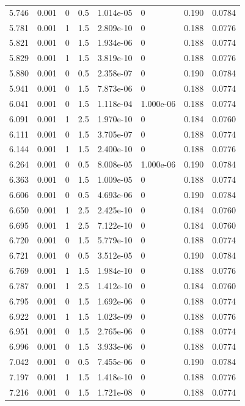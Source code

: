\documentclass[preview]{standalone}
\begin{document}
{{{\begin{tabular}{L{1.2cm}C{1.2cm} C{0.3cm}C{0.5cm} C{1.4cm}C{1.4cm} C{1.4cm}C{1.4cm}}
  5.746  &  0.001  & 0     & 0.5 &  1.014e-05  & 0  & 0.190 &  0.0784   \\ 
  5.781  &  0.001  & 1     & 1.5 &  2.809e-10  & 0  & 0.188 &  0.0776   \\ 
  5.821  &  0.001  & 0     & 1.5 &  1.934e-06  & 0  & 0.188 &  0.0774   \\ 
  5.829  &  0.001  & 1     & 1.5 &  3.819e-10  & 0  & 0.188 &  0.0776   \\ 
  5.880  &  0.001  & 0     & 0.5 &  2.358e-07  & 0  & 0.190 &  0.0784   \\ 
  5.941  &  0.001  & 0     & 1.5 &  7.873e-06  & 0  & 0.188 &  0.0774   \\ 
  6.041  &  0.001  & 0     & 1.5 &  1.118e-04  & 1.000e-06  & 0.188 &  0.0774   \\ 
  6.091  &  0.001  & 1     & 2.5 &  1.970e-10  & 0  & 0.184 &  0.0760   \\ 
  6.111  &  0.001  & 0     & 1.5 &  3.705e-07  & 0  & 0.188 &  0.0774   \\ 
  6.144  &  0.001  & 1     & 1.5 &  2.400e-10  & 0  & 0.188 &  0.0776   \\ 
  6.264  &  0.001  & 0     & 0.5 &  8.008e-05  & 1.000e-06  & 0.190 &  0.0784   \\ 
  6.363  &  0.001  & 0     & 1.5 &  1.009e-05  & 0  & 0.188 &  0.0774   \\ 
  6.606  &  0.001  & 0     & 0.5 &  4.693e-06  & 0  & 0.190 &  0.0784   \\ 
  6.650  &  0.001  & 1     & 2.5 &  2.425e-10  & 0  & 0.184 &  0.0760   \\ 
  6.695  &  0.001  & 1     & 2.5 &  7.122e-10  & 0  & 0.184 &  0.0760   \\ 
  6.720  &  0.001  & 0     & 1.5 &  5.779e-10  & 0  & 0.188 &  0.0774   \\ 
  6.721  &  0.001  & 0     & 0.5 &  3.512e-05  & 0  & 0.190 &  0.0784   \\ 
  6.769  &  0.001  & 1     & 1.5 &  1.984e-10  & 0  & 0.188 &  0.0776   \\ 
  6.787  &  0.001  & 1     & 2.5 &  1.412e-10  & 0  & 0.184 &  0.0760   \\ 
  6.795  &  0.001  & 0     & 1.5 &  1.692e-06  & 0  & 0.188 &  0.0774   \\ 
  6.922  &  0.001  & 1     & 1.5 &  1.023e-09  & 0  & 0.188 &  0.0776   \\ 
  6.951  &  0.001  & 0     & 1.5 &  2.765e-06  & 0  & 0.188 &  0.0774   \\ 
  6.996  &  0.001  & 0     & 1.5 &  3.933e-06  & 0  & 0.188 &  0.0774   \\ 
  7.042  &  0.001  & 0     & 0.5 &  7.455e-06  & 0  & 0.190 &  0.0784   \\ 
  7.197  &  0.001  & 1     & 1.5 &  1.418e-10  & 0  & 0.188 &  0.0776   \\ 
  7.216  &  0.001  & 0     & 1.5 &  1.721e-08  & 0  & 0.188 &  0.0774   \\ 
\hline 
\end{tabular} 

}}}
\end{document}
